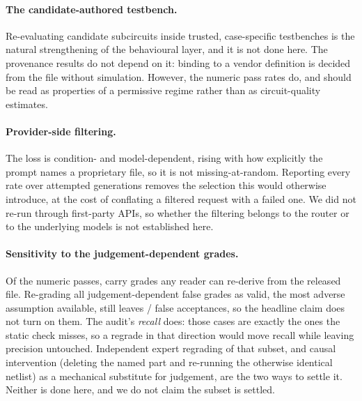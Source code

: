 \paragraph{The candidate-authored testbench.}
Re-evaluating candidate subcircuits inside trusted, case-specific testbenches
is the natural strengthening of the behavioural layer, and it is not done
here. The provenance results do not depend on it: binding to a vendor
definition is decided from the file without simulation. However, the
numeric pass rates do, and should be read as properties of a permissive regime
rather than as circuit-quality estimates.

\paragraph{Provider-side filtering.}
The loss is condition- and model-dependent, rising with how explicitly the
prompt names a proprietary file, so it is not missing-at-random. Reporting
every rate over attempted generations removes the selection this would
otherwise introduce, at the cost of conflating a filtered request with a
failed one. We did not re-run through first-party APIs, so whether the
filtering belongs to the router or to the underlying models is not established
here.

\paragraph{Sensitivity to the judgement-dependent grades.}
Of the \NumNumericPass{} numeric passes, \ConfTP{} carry grades any reader can
re-derive from the released file. Re-grading all \GroundsFakeRead{}
judgement-dependent false grades as valid, the most adverse assumption
available, still leaves \ConfTP{}/\NumNumericPass{} false acceptances, so the
headline claim does not turn on them. The audit's \emph{recall} does: those
\ProvFN{} cases are exactly the ones the static check misses, so a regrade in
that direction would move recall while leaving precision untouched.
Independent expert regrading of that subset, and causal intervention (deleting
the named part and re-running the otherwise identical netlist) as a mechanical
substitute for judgement, are the two ways to settle it. Neither is done here,
and we do not claim the subset is settled.

